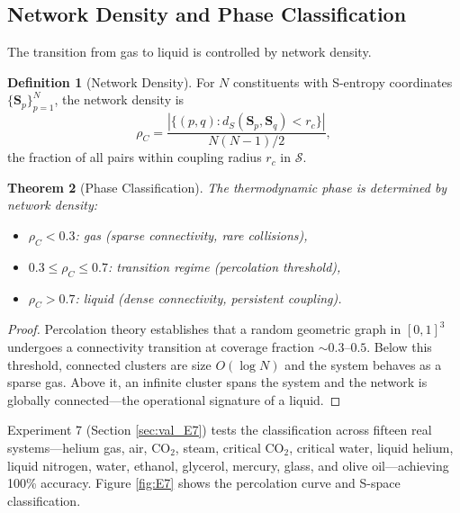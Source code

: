 \documentclass[twocolumn,10pt,a4paper]{article}
\newtheorem{theorem}{Theorem}[section]
\theoremstyle{definition}
\newtheorem{definition}[theorem]{Definition}
\theoremstyle{remark}
\newcommand{\Sspace}{\mathcal{S}}
\begin{document}
\subsection{Network Density and Phase Classification}

The transition from gas to liquid is controlled by network density.

\begin{definition}[Network Density]
\label{def:network_density}
For $N$ constituents with S-entropy coordinates $\{\mathbf{S}_p\}_{p=1}^{N}$, the network density is
\begin{equation}
\rho_C = \frac{|\{(p,q): d_S(\mathbf{S}_p, \mathbf{S}_q) < r_c\}|}{N(N-1)/2},
\label{eq:network_density}
\end{equation}
the fraction of all pairs within coupling radius $r_c$ in $\Sspace$.
\end{definition}

\begin{theorem}[Phase Classification]
\label{thm:phase_class}
The thermodynamic phase is determined by network density:
\begin{itemize}[leftmargin=1.2em,nosep]
\item $\rho_C < 0.3$: gas (sparse connectivity, rare collisions),
\item $0.3 \leq \rho_C \leq 0.7$: transition regime (percolation threshold),
\item $\rho_C > 0.7$: liquid (dense connectivity, persistent coupling).
\end{itemize}
\end{theorem}

\begin{proof}
Percolation theory \citep{stauffer1979} establishes that a random geometric graph in $[0,1]^3$ undergoes a connectivity transition at coverage fraction $\sim 0.3$--$0.5$. Below this threshold, connected clusters are size $O(\log N)$ and the system behaves as a sparse gas. Above it, an infinite cluster spans the system and the network is globally connected---the operational signature of a liquid.
\end{proof}

Experiment 7 (Section \ref{sec:val_E7}) tests the classification across fifteen real systems---helium gas, air, CO$_2$, steam, critical CO$_2$, critical water, liquid helium, liquid nitrogen, water, ethanol, glycerol, mercury, glass, and olive oil---achieving 100\% accuracy. Figure \ref{fig:E7} shows the percolation curve and S-space classification.
\end{document}
